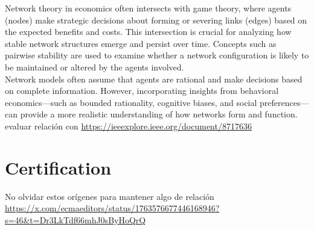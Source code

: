 Network theory in economics often intersects with game theory, where agents (nodes) make strategic decisions about forming or severing links (edges) based on the expected benefits and costs. This intersection is crucial for analyzing how stable network structures emerge and persist over time. Concepts such as pairwise stability are used to examine whether a network configuration is likely to be maintained or altered by the agents involved.  \\
Network models often assume that agents are rational and make decisions based on complete information. However, incorporating insights from behavioral economics—such as bounded rationality, cognitive biases, and social preferences—can provide a more realistic understanding of how networks form and function.
 \\



evaluar relación con \url{https://ieeexplore.ieee.org/document/8717636}

\section{Certification}

No olvidar estos orígenes para mantener algo de relación \url{https://x.com/ecmaeditors/status/1763576677446168946?s=46&t=Dr3LkTdf66mhJ0sByHoQrQ}












